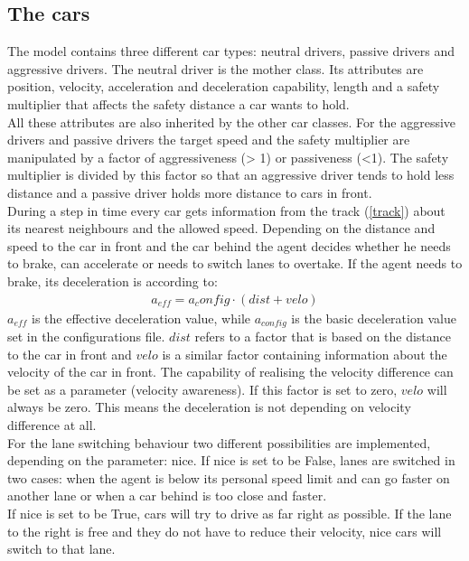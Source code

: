\documentclass[11pt,a4paper,twocolumn]{article}
\begin{document}
\subsection{The cars} \label{cars}
The model contains three different car types: neutral drivers, passive drivers and aggressive drivers. The neutral driver is the mother class. Its attributes are position, velocity, acceleration and deceleration capability, length and a safety multiplier that affects the safety distance a car wants to hold. \\
All these attributes are also inherited by the other car classes. 
For the aggressive drivers and passive drivers the target speed and the safety multiplier are manipulated by a factor of aggressiveness (> 1) or passiveness (<1). The safety multiplier is divided by this factor so that an aggressive driver tends to hold less distance and a passive driver holds more distance to cars in front. \\
During a step in time every car gets information from the track (\ref{track}) about its nearest neighbours and the allowed speed. Depending on the distance and speed to the car in front and the car behind the agent decides whether he needs to brake, can accelerate or needs to switch lanes to overtake. If the agent needs to brake, its deceleration is according to:
\begin{align*}
a_{eff} = a_config \cdot (dist + velo)
\end{align*}
$a_{eff}$ is the effective deceleration value, while $a_{config}$ is the basic deceleration value set in the configurations file. $dist$ refers to a factor that is based on the distance to the car in front and $velo$ is a similar factor containing information about the velocity of the car in front. The capability of realising the velocity difference can be set as a parameter (velocity awareness). If this factor is set to zero, $velo$ will always be zero. This means the deceleration is not depending on velocity difference at all.\\
For the lane switching behaviour two different possibilities are implemented, depending on the parameter: nice. If nice is set to be False, lanes are switched in two cases: when the agent is below its personal speed limit and can go faster on another lane or when a car behind is too close and faster.\\
If nice is set to be True, cars will try to drive as far right as possible. If the lane to the right is free and they do not have to reduce their velocity, nice cars will switch to that lane. 
\end{document}
